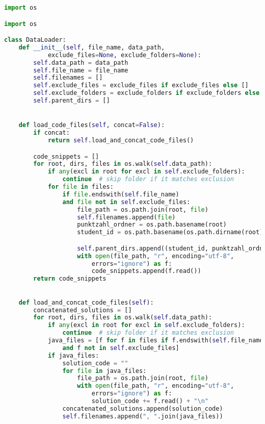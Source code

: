 \begin{lstlisting}[language=Python, caption={\texttt{data\_loader.py}}, label={prco:data-loader}]
import os

import os

class DataLoader:
    def __init__(self, file_name, data_path, 
            exclude_files=None, exclude_folders=None):
        self.data_path = data_path
        self.file_name = file_name
        self.filenames = []
        self.exclude_files = exclude_files if exclude_files else []
        self.exclude_folders = exclude_folders if exclude_folders else []
        self.parent_dirs = []


    def load_code_files(self, concat=False):
        if concat:
            return self.load_and_concat_code_files()

        code_snippets = []
        for root, dirs, files in os.walk(self.data_path):
            if any(excl in root for excl in self.exclude_folders):
                continue  # skip folder if it matches exclusion
            for file in files:
                if file.endswith(self.file_name) 
                and file not in self.exclude_files:
                    file_path = os.path.join(root, file)
                    self.filenames.append(file)
                    punktzahl_ordner = os.path.basename(root)
                    student_id = os.path.basename(os.path.dirname(root))

                    self.parent_dirs.append((student_id, punktzahl_ordner))
                    with open(file_path, "r", encoding="utf-8", 
                        errors="ignore") as f:
                        code_snippets.append(f.read())
        return code_snippets
    

    def load_and_concat_code_files(self):
        concatenated_solutions = []
        for root, dirs, files in os.walk(self.data_path):
            if any(excl in root for excl in self.exclude_folders):
                continue  # skip folder if it matches exclusion
            java_files = [f for f in files if f.endswith(self.file_name) 
                and f not in self.exclude_files]
            if java_files:
                solution_code = "" 
                for file in java_files:
                    file_path = os.path.join(root, file)
                    with open(file_path, "r", encoding="utf-8", 
                        errors="ignore") as f:
                        solution_code += f.read() + "\n"
                concatenated_solutions.append(solution_code)
                self.filenames.append(", ".join(java_files))
                

\end{lstlisting}
